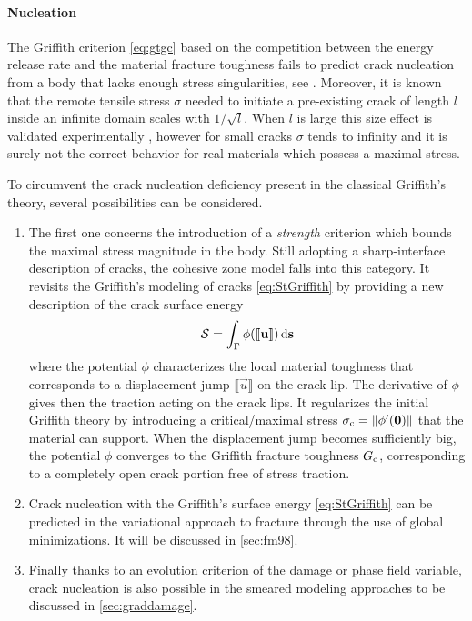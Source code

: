 \paragraph{Nucleation} The Griffith criterion \eqref{eq:gtgc} based on the competition between the energy release rate and the material fracture toughness fails to predict crack nucleation from a body that lacks enough stress singularities, see \cite{Marigo:2010}. Moreover, it is known that the remote tensile stress $\sigma$ needed to initiate a pre-existing crack of length $l$ inside an infinite domain scales with $1/\sqrt{l}$. When $l$ is large this size effect is validated experimentally \cite{Griffith:1921}, however for small cracks $\sigma$ tends to infinity and it is surely not the correct behavior for real materials which possess a maximal stress. 

To circumvent the crack nucleation deficiency present in the classical Griffith's theory, several possibilities can be considered.
\begin{enumerate}
\item The first one concerns the introduction of a \emph{strength} criterion which bounds the maximal stress magnitude in the body. Still adopting a sharp-interface description of cracks, the cohesive zone model \cite{Barenblatt:1962,ElicesGuineaGomezPlanas:2002} falls into this category. It revisits the Griffith's modeling of cracks \eqref{eq:StGriffith} by providing a new description of the crack surface energy
\begin{equation} \label{eq:cohesiveSt}
\mathcal{S}=\int_{\Gamma}\phi(\llbracket\vec{u}\rrbracket)\ds
\end{equation}
where the potential $\phi$ characterizes the local material toughness that corresponds to a displacement jump $\llbracket\vec{u}\rrbracket$ on the crack lip. The derivative of $\phi$ gives then the traction acting on the crack lips. It regularizes the initial Griffith theory by introducing a critical/maximal stress $\sigma_\mc=\norm{\phi'(\vec{0})}$ that the material can support. When the displacement jump becomes sufficiently big, the potential $\phi$ converges to the Griffith fracture toughness $G_\mathrm{c}$, corresponding to a completely open crack  portion free of stress traction.

\item Crack nucleation with the Griffith's surface energy \eqref{eq:StGriffith} can be predicted in the variational approach to fracture through the use of global minimizations. It will be discussed in \cref{sec:fm98}.

\item Finally thanks to an evolution criterion of the damage or phase field variable, crack nucleation is also possible in the smeared modeling approaches to be discussed in \cref{sec:graddamage}.
\end{enumerate}

